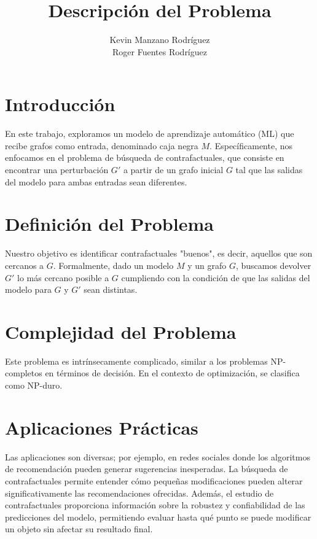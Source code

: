 \documentclass[a4paper]{article}
\title{Descripción del Problema}
\author{Kevin Manzano Rodr\'iguez \\ Roger Fuentes Rodr\'iguez}
\date{}
\begin{document}
\maketitle

\section{Introducción}
En este trabajo, exploramos un modelo de aprendizaje automático (ML) que recibe grafos como entrada, denominado caja negra \(M\). Específicamente, nos enfocamos en el problema de búsqueda de contrafactuales, que consiste en encontrar una perturbación \(G'\) a partir de un grafo inicial \(G\) tal que las salidas del modelo para ambas entradas sean diferentes.

\section{Definición del Problema}
Nuestro objetivo es identificar contrafactuales "buenos", es decir, aquellos que son cercanos a \(G\). Formalmente, dado un modelo \(M\) y un grafo \(G\), buscamos devolver \(G'\) lo más cercano posible a \(G\) cumpliendo con la condición de que las salidas del modelo para \(G\) y \(G'\) sean distintas.

\section{Complejidad del Problema}
Este problema es intrínsecamente complicado, similar a los problemas NP-completos en términos de decisión. En el contexto de optimización, se clasifica como NP-duro. 

\section{Aplicaciones Prácticas}
Las aplicaciones son diversas; por ejemplo, en redes sociales donde los algoritmos de recomendación pueden generar sugerencias inesperadas. La búsqueda de contrafactuales permite entender cómo pequeñas modificaciones pueden alterar significativamente las recomendaciones ofrecidas. Además, el estudio de contrafactuales proporciona información sobre la robustez y confiabilidad de las predicciones del modelo, permitiendo evaluar hasta qué punto se puede modificar un objeto sin afectar su resultado final.
\end{document}
